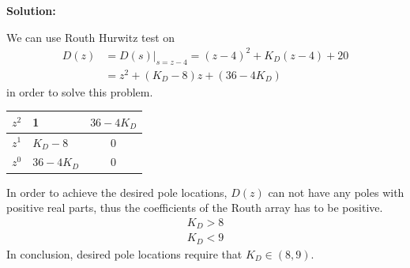 \documentclass[twoside]{article}
\newcommand{\sol}{\textbf{Solution:}\ }
\begin{document}
\sol

We can use Routh Hurwitz test on 
%
\begin{align*}
  D(z)  &= D(s)|_{s = z- 4} = (z-4)^2 + K_D (z-4) + 20
\\
&=  z^2 + (K_D - 8) z + (36 - 4 K_D)
\end{align*}
%
in order to solve this problem. 
%

\begin{center}
\begin{tabular}{|c || F || c  |}
\hline
$z^2$ & 1 & $36- 4 K_D$ 
\\ \hline
$z^1$ & $K_D - 8$ & 0 
\\ \hline
$z^0$ & $36- 4 K_D$ & 0 
\\ \hline
\end{tabular}
\end{center}

%
In order to achieve the desired pole locations, $D(z)$
can not have any poles with positive real parts, thus
the coefficients of the Routh array has to be positive.
%
\begin{align*}
  K_D > 8
  \\
  K_D < 9
\end{align*}
%
In conclusion, desired pole locations require that 
$K_D \in (8 , 9)$.



\end{document}
